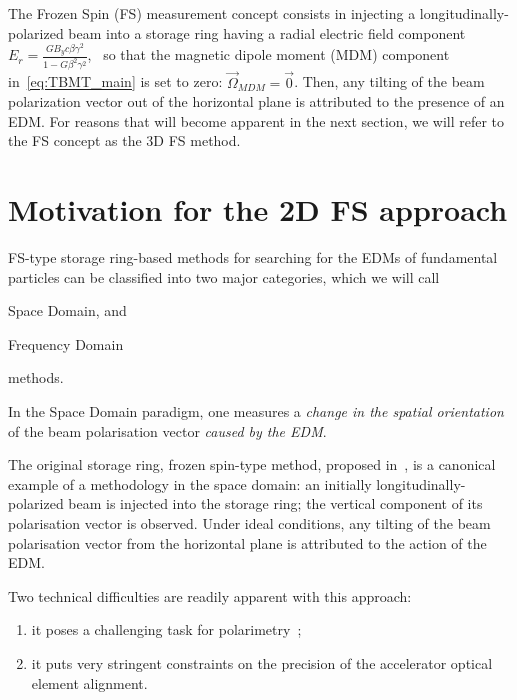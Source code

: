 \documentclass[]{elsarticle}
\newcommand{\W}{\Omega}
\begin{document}
The Frozen Spin (FS) measurement concept consists in injecting a longitudinally-polarized beam
into a storage ring having a radial electric field component
$E_r = \frac{GB_yc\beta\gamma^2}{1-G\beta^2\gamma^2}$,~\cite[p.~10]{BNL:Deuteron2008} so that the
magnetic dipole moment (MDM) component in~\eqref{eq:TBMT_main} is set to zero: $\vec\W_{MDM} = \vec 0$.
Then, any tilting of the beam polarization vector out of the horizontal plane
is attributed to the presence of an EDM. For reasons that will become apparent in the next section,
we will refer to the FS concept as the 3D FS method.


\section{Motivation for the 2D FS approach}

FS-type storage ring-based methods for searching for the EDMs of fundamental particles
can be classified into two major categories, which we will call
\begin{enumerate*}%
\item Space Domain, and %
\item Frequency Domain %
\end{enumerate*}
methods.

In the Space Domain paradigm, one measures a \emph{change in the spatial orientation} of the beam polarisation
vector \emph{caused by the EDM}.

The original storage ring, frozen spin-type method, proposed in~\cite{BNL:Deuteron2008}, is a canonical example of
a methodology in the space domain: an initially longitudinally-polarized beam is injected into the storage ring;
the vertical component of its polarisation vector is observed. Under ideal conditions, any tilting of
the beam polarisation vector from the horizontal plane is attributed to the action of the EDM.

Two technical difficulties are readily apparent with this approach:
\begin{enumerate}
\item it poses a challenging task for polarimetry~\cite{Mane:SpinWheel};
\item it puts very stringent constraints on the precision of the accelerator optical element alignment.
\end{enumerate}
\end{document}
